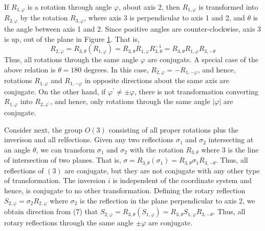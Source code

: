 \begin{figure}
\caption{}
\label{chap16-fig2}
\end{figure}

If $R_{1,\varphi}$ is a rotation through angle $\varphi$, about axis
2, then $R_{1,\varphi}$ is transformed into $R_{2,\varphi}$ by the
rotation $R_{3,\varphi}$, where axis 3 is perpendicular to axis 1 and
2, and $\theta$ is the angle between axis 1 and 2.  Since positive
angles are counter-clockwise, axis 3 is up, out of the plane in Figure
\ref{chap16-fig2}.  That is,
\begin{equation}
R_{2,\varphi} = R_{3,\theta}(R_{1,\varphi}) = 
R_{3,\theta}R_{1,\varphi}R^{-1}_{3,\theta} = 
R_{3,\theta}R_{1,\varphi}R_{3,-\theta}
\label{chap16-eqno7}
\end{equation}
Thus, all rotations through the same angle $\varphi$ are conjugate.  A 
special case of the above relation is $\theta = 180$ degrees.  In this 
case, $R_{2,\varphi} =- R_{1,-\varphi}$, and hence, rotations 
$R_{1,\varphi}$ and $R_{1,-\varphi}$ in opposite directions about the 
same axis are conjugate.  On the other hand, if $\varphi^{\prime} 
\not= \pm \varphi$, there is not transformation converting $R_{1, 
\varphi}$ into $R_{2,\varphi^{\prime}}$, and hence, only rotations 
through the same angle $|\varphi|$ are conjugate.

\begin{figure}
\caption{}
\label{chap16-fig3}
\end{figure}

Consider next, the group $O(3)$ consisting of all proper rotations
plus the inverison and all relfections.  Given any two reflections
$\sigma_1$ and $\sigma_2$ intersecting at an angle $\theta$, we can
transform $\sigma_1$ and $\sigma_2$ with the rotation $R_{3,\theta}$
where 3 is the line of intersection of two planes.  That is, $\sigma =
R_{3,\theta}(\sigma_1) = R_{3,\theta} \sigma_1 R_{3,-\theta}$.  Thus,
all reflections of $(3)$ are conjugate, but they are not conjugate
with any other type of transformation.  The inversion $i$ is
independent of the coordinate system and hence, is conjugate to no
other transformation.  Defining the rotary reflection
$S_{2,\varphi}=\sigma_2R_{2,\varphi}$ where $\sigma_2$ is the
reflection in the plane perpendicular to axis 2, we obtain direction
from (7) that $S_{2,\varphi} = R_{3,\theta}(S_{1,\varphi}) =
R_{3,\theta}S_{1,\varphi}R_{3,-\theta}$.  Thus, all rotary reflections
through the same angle $\pm \varphi$ are conjugate.

